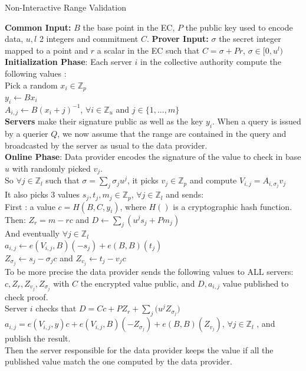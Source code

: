 \documentclass{article}
\begin{document}
\begin{algorithm}[H]
\caption{Non-Interactive Range Validation}\label{euclid}
\begin{algorithmic}[1]
\State \textbf{Common Input:} $B$ the base point in the EC, $P$ the public key used to encode data, $u, l$ 2 integers and commitment $C$.
\State \textbf{Prover Input:} $\sigma$ the secret integer mapped to a point and $r$ a scalar in the EC such that $C = \sigma + Pr$, $\sigma \in [0,u^l)$\\

\State \textbf{Initialization Phase}: Each server $i$ in the collective authority compute the following values :\\
Pick a random $x_i \in \mathbb{Z}_p$\\
$y_i \gets Bx_i$\\
$A_{i,j} \gets B(x_i + j)^{-1} $, $\forall i \in \mathbb{Z}_u$ and $j \in \{1,...,m\}$\\
\State  \textbf{Servers} make their signature public as well as the key $y_i$. When a query is issued by a querier $Q$, we now assume that the range are contained in the query and broadcasted by the server as usual to the data provider.\\

\State \textbf{Online Phase}: Data provider encodes the signature of the value to check in base $u$ with randomly picked $v_j$.\\
So $\forall j \in \mathbb{Z}_l $ such that $ \sigma = \sum_{j}{\sigma_j u^j}$, it picks $v_j \in \mathbb{Z}_p$ and compute $V_{i,j} = A_{i,\sigma_j}v_j$\\
It also picks 3 values $s_j,t_j,m_j \in \mathbb{Z}_p $, $\forall j \in \mathbb{Z}_l$ and sends:\\
First : a value $c = H(B,C,y_i)$, where $H()$ is a cryptographic hash function.\\  Then: $Z_r = m-rc$ and $D \gets \sum_{j}{(u^j s_j + Pm_j)}$\\
And eventually $ \forall j \in \mathbb{Z}_l$\\
$a_{i,j} \gets e(V_{i,j},B)(-s_j)+e(B,B)(t_j)$\\ $Z_{\sigma_j} \gets s_j-\sigma_j c$ and $Z_{v_j} \gets t_j-v_j c$\\
To be more precise the data provider sends the following values to ALL servers: $ c, Z_r, Z_{v_j}, Z_{\sigma_j}$ with $C$ the encrypted value public, and $D, a_{i,j}$ value published to check proof.\\

\State Server $i$ checks that $D = Cc + PZ_r + \sum_{j}{(u^j Z_{\sigma_j}}) $\\
$a_{i,j} = e(V_{i,j},y)c + e(V_{i,j},B)(-Z_{\sigma_j}) + e(B,B)(Z_{v_j})$, $\forall j \in \mathbb{Z}_l$ , and publish the result.\\

Then the server responsible for the data provider keeps the value if all the published value match the one computed by the data provider.
\end{algorithmic}
\end{algorithm}
\end{document}
